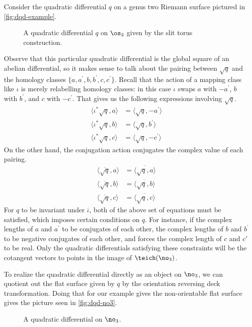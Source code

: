 \documentclass[12pt, reqno]{amsart}
\begin{document}
\begin{example}
  Consider the quadratic differential $q$ on a genus two Riemann surface pictured in \autoref{fig:dqd-example}.
  \begin{figure}[h]
    \centering
    \caption{A quadratic differential $q$ on $\os_2$ given by the slit torus construction.}
    \label{fig:dqd-example}
  \end{figure}

  Observe that this particular quadratic differential is the global square of an abelian differential, so it makes sense to talk about the pairing between $\sqrt{q}$ and the homology classes $\{a, a^{\prime}, b, b^{\prime}, c, c^{\prime}\}$.
  Recall that the action of a mapping class like $\iota$ is merely relabelling homology classes: in this case $\iota$ swaps $a$ with $-a^{\prime}$, $b$ with $b^{\prime}$, and $c$ with $-c^{\prime}$.
  That gives us the following expressions involving $\sqrt{q}$.
  \begin{align}
    \label{eq:back-12}
    \langle \iota^{\ast}\sqrt{q}, a \rangle &= \langle \sqrt{q}, -a^{\prime} \rangle \\
    \langle \iota^{\ast}\sqrt{q}, b \rangle &= \langle \sqrt{q}, b^{\prime} \rangle \\
    \langle \iota^{\ast}\sqrt{q}, c \rangle &= \langle \sqrt{q}, -c^{\prime} \rangle
  \end{align}
  On the other hand, the conjugation action conjugates the complex value of each pairing.
  \begin{align}
    \label{eq:back-13}
    \langle \overline{\sqrt{q}}, a \rangle &= \overline{  \langle \sqrt{q}, a \rangle } \\
    \langle \overline{\sqrt{q}}, b \rangle &= \overline{  \langle \sqrt{q}, b \rangle } \\
    \langle \overline{\sqrt{q}}, c \rangle &= \overline{  \langle \sqrt{q}, c \rangle }
  \end{align}
  For $q$ to be invariant under $\overline{\iota}$, both of the above set of equations must be satisfied, which imposes certain conditions on $q$.
  For instance, if the complex lengths of $a$ and $a^{\prime}$ to be conjugates of each other, the complex lengths of $b$ and $b^{\prime}$ to be negative conjugates of each other, and forces the complex length of $c$ and $c'$ to be real.
  Only the quadratic differentials satisfying these constraints will be the cotangent vectors to points in the image of $\teich(\no_3)$.

  To realize the quadratic differential directly as an object on $\no_3$, we can quotient out the flat surface given by $q$ by the orientation reversing deck transformation.
  Doing that for our example gives the non-orientable flat surface gives the picture seen in \autoref{fig:dqd-no3}.
  \begin{figure}[h]
    \centering
    \caption{A quadratic differential on $\no_3$.}
    \label{fig:dqd-no3}
  \end{figure}
\end{example}
\end{document}
